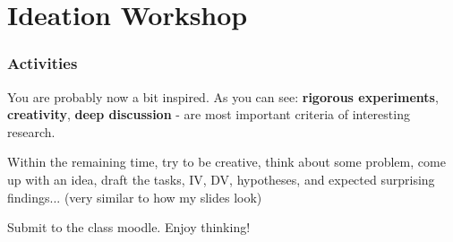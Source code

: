 \documentclass{beamer}
\begin{document}
\section{Ideation Workshop}

\begin{frame}
	\frametitle{Activities}
    \begin{tcolorbox}[colback=blue!10, colframe=blue!50!black, title=Ideation Workshop]
		\footnotesize
		\item You are probably now a bit inspired.  As you can see:  \textbf{rigorous experiments}, \textbf{creativity}, \textbf{deep discussion} - are most important criteria of interesting research.
        \item Within the remaining time,  try to be creative, think about some problem, come up with an idea, draft the tasks, IV, DV, hypotheses, and expected surprising findings... (very similar to how my slides look)
        \item Submit to the class moodle.  Enjoy thinking!
		\centering
	\end{tcolorbox}
\end{frame}
\end{document}
